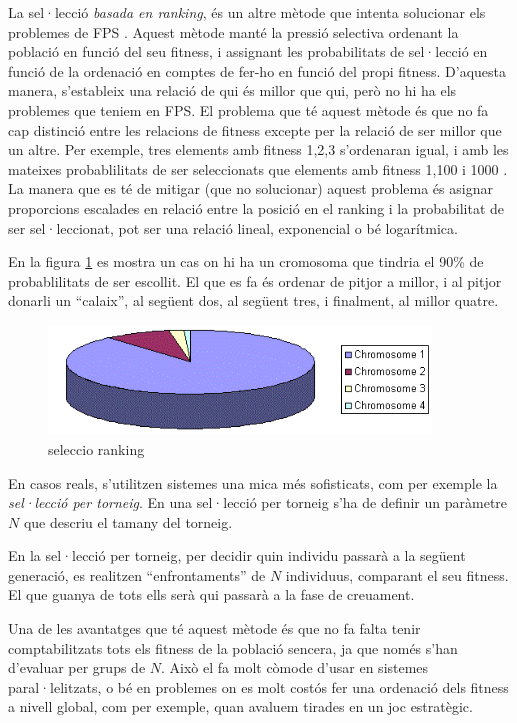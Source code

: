 \documentclass[titlepage,a4paper,12pt]{book}
\begin{document}
La sel·lecció \emph{basada en ranking}, és un altre mètode que intenta
solucionar els problemes de FPS \cite{B87a}.  Aquest mètode manté la pressió
selectiva ordenant la població en funció del seu fitness, i assignant les
probabilitats de sel·lecció en funció de la ordenació en comptes de fer-ho en
funció del propi fitness. D'aquesta manera, s'estableix una relació de qui és
millor que qui, però no hi ha els problemes que teniem en FPS.  El problema que
té aquest mètode és que no fa cap distinció entre les relacions de fitness
excepte per la relació de ser millor que un altre.  Per exemple, tres elements
amb fitness 1,2,3 s'ordenaran igual, i amb les mateixes probablilitats de ser
seleccionats que elements amb fitness 1,100 i 1000 .  La manera que es té de
mitigar (que no solucionar) aquest problema és asignar proporcions escalades en
relació entre la posició en el ranking i la probabilitat de ser sel·leccionat,
pot ser una relació lineal, exponencial o bé logarítmica. 

En la figura \ref{fig:rank1} es mostra  un cas on hi ha un cromosoma que tindria
el 90\% de probablilitats de ser escollit. El que es fa és ordenar de pitjor a
millor, i al pitjor donarli un ``calaix'', al següent dos, al següent tres, i
finalment, al millor quatre. 

\begin{figure} \centering \includegraphics[width=4in]{intro/rank1.png}
\caption{\label{fig:rank1}seleccio ranking}
\end{figure}

En casos reals, s'utilitzen sistemes una mica més sofisticats, com per exemple
la \emph{sel·lecció per torneig}.  En una sel·lecció per torneig s'ha de definir
un paràmetre $N$ que descriu el tamany del torneig.

En la sel·lecció per torneig, per decidir quin individu passarà a la següent
generació, es realitzen ``enfrontaments'' de $N$ individuus, comparant el seu
fitness.  El que guanya de tots ells serà qui passarà a la fase de creuament.

Una de les avantatges que té aquest mètode és que no fa falta tenir
comptabilitzats tots els fitness de la població sencera, ja que només s'han
d'evaluar per grups de $N$.  Això el fa molt còmode d'usar en sistemes
paral·lelitzats, o bé en problemes on es molt costós fer una ordenació dels
fitness a nivell global, com per exemple, quan avaluem tirades en un joc
estratègic.
\end{document}
